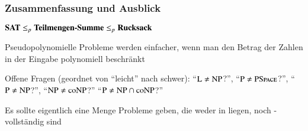 \documentclass[onlymath]{beamer}
\begin{document}
\begin{frame}\frametitle{Zusammenfassung und Ausblick}

$\textbf{\textcolor{black}{SAT}}\leq_p\textbf{\textcolor{black}{Teilmengen-Summe}}\leq_p \textbf{\textcolor{black}{Rucksack}}$
\bigskip

Pseudopolynomielle Probleme werden einfacher, wenn man den Betrag der Zahlen in der Eingabe polynomiell beschränkt\bigskip

Offene Fragen (geordnet von "`leicht"' nach schwer):
"`${\textsc{L}}\neq{\textsc{NP}}$?"',
"`${\textsc{P}}\neq{\textsc{PSpace}}$?"',
"`${\textsc{P}}\neq{\textsc{NP}}$?"',
"`${\textsc{NP}}\neq{\textsc{coNP}}$?"'
"`${\textsc{P}}\neq {\textsc{NP}}\cap{\textsc{coNP}}$?"'
\bigskip

Es sollte eigentlich eine Menge Probleme geben, die weder in  liegen, noch -vollständig sind\bigskip


\end{frame}



% 
% 
% 
% 
% 
% 
\end{document}
